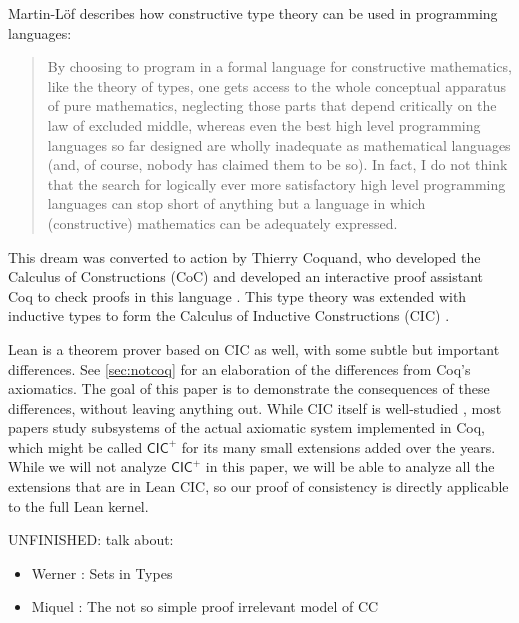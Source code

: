 Martin-L\"{o}f describes how constructive type theory can be used in programming languages:
\begin{quote}
By choosing to program in a formal language for constructive mathematics, like the theory of types, one gets access to the whole conceptual apparatus of pure mathematics, neglecting those parts that depend critically on the law of excluded middle, whereas even the best high level programming languages so far designed are wholly inadequate as mathematical languages (and, of course, nobody has claimed them to be so). In fact, I do not think that the search for logically ever more satisfactory high level programming languages can stop short of anything but a language in which (constructive) mathematics can be adequately expressed. \cite{martinlofprog}
\end{quote}

This dream was converted to action by Thierry Coquand, who developed the Calculus of Constructions (CoC) \cite{coquandcoc} and developed an interactive proof assistant \textsf{Coq} to check proofs in this language \cite{coqart}. This type theory was extended with inductive types \cite{dybjer} to form the Calculus of Inductive Constructions (CIC) \cite{paulincic}.

Lean \cite{demoura} is a theorem prover based on CIC as well, with some subtle but important differences. See \autoref{sec:notcoq} for an elaboration of the differences from Coq's axiomatics. The goal of this paper is to demonstrate the consequences of these differences, without leaving anything out. While CIC itself is well-studied \cite{barrassets, barrastypedec, coqincoq}, most papers study subsystems of the actual axiomatic system implemented in Coq, which might be called $\mathsf{CIC^+}$ for its many small extensions added over the years. While we will not analyze $\mathsf{CIC^+}$ in this paper, we will be able to analyze all the extensions that are in Lean CIC, so our proof of consistency is directly applicable to the full Lean kernel.

UNFINISHED: talk about:
\begin{itemize}
\item Werner \cite{setsintypes}: Sets in Types
\item Miquel \cite{notsosimple}: The not so simple proof irrelevant model of CC
\end{itemize}
